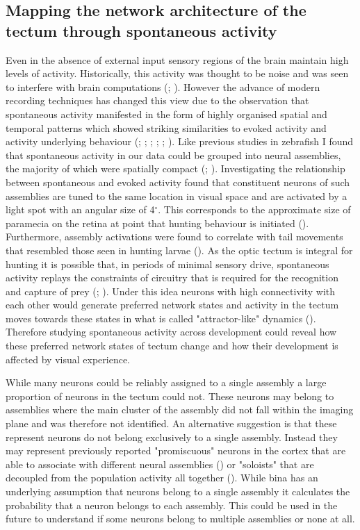 \subsection{Mapping the network architecture of the tectum through spontaneous activity}
Even in the absence of external input sensory regions of the brain maintain high levels of activity. Historically, this activity was thought to be noise and was seen to interfere with brain computations (\cite{Faisal2008NoiseSystem}; \cite{Tolhurst1983TheCortex}). However the advance of modern recording techniques has changed this view due to the observation that spontaneous activity manifested in the form of highly organised spatial and temporal patterns which showed striking similarities to evoked activity and activity underlying behaviour (\cite{Kenet2003}; \cite{Luczak2007}; \cite{Luczak2009}; \cite{Miller2014}; \cite{Carrillo-Reid2015}; \cite{Romano2015}). Like previous studies in zebrafish I found that spontaneous activity in our data could be grouped into neural assemblies, the majority of which were spatially compact (\cite{Romano2015}; \cite{Avitan2017}). Investigating the relationship between spontaneous and evoked activity \cite{Romano2015} found that constituent neurons of such assemblies are tuned to the same location in visual space and are activated by a light spot with an angular size of 4$^\circ$. This corresponds to the approximate size of paramecia on the retina at point that hunting behaviour is initiated (\cite{Bianco2015}). Furthermore, assembly activations were found to correlate with tail movements that resembled those seen in hunting larvae (\cite{Romano2015}).  As the optic tectum is integral for hunting it is possible that, in periods of minimal sensory drive,  spontaneous activity replays the constraints of circuitry that is required for the recognition and capture of prey (\cite{Romano2015}; \cite{Marachlian2018PrinciplesTectum}). Under this idea neurons with high connectivity with each other would generate preferred network states and activity in the tectum moves towards these states in what is called "attractor-like" dynamics (\cite{Marachlian2018PrinciplesTectum}). Therefore studying spontaneous activity across development could reveal how these preferred network states of tectum change and how their development is affected by visual experience.

While many neurons could be reliably assigned to a single assembly a large proportion of neurons in the tectum could not. These neurons may belong to assemblies where the main cluster of the assembly did not fall within the imaging plane and was therefore not identified.  An alternative suggestion is that these represent neurons do not belong exclusively to a single assembly. Instead they may represent previously reported "promiscuous" neurons in the cortex that are able to associate with different neural assemblies (\cite{Miller2014}) or "soloists" that are decoupled from the population activity all together (\cite{Okun2015}). While \gls{bina} has an underlying assumption that neurons belong to a single assembly it calculates the probability that a neuron belongs to each assembly. This could be used in the future to understand if some neurons belong to multiple assemblies or none at all.

